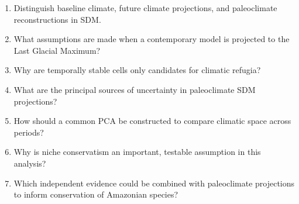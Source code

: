 \begin{enumerate}
\item Distinguish baseline climate, future climate projections, and paleoclimate reconstructions in SDM.
\item What assumptions are made when a contemporary model is projected to the Last Glacial Maximum?
\item Why are temporally stable cells only candidates for climatic refugia?
\item What are the principal sources of uncertainty in paleoclimate SDM projections?
\item How should a common PCA be constructed to compare climatic space across periods?
\item Why is niche conservatism an important, testable assumption in this analysis?
\item Which independent evidence could be combined with paleoclimate projections to inform conservation of Amazonian species?
\end{enumerate}

